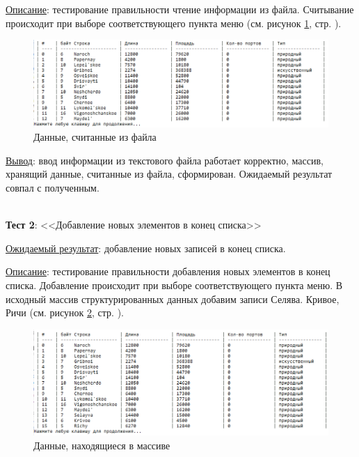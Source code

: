 \underline{Описание}: тестирование правильности чтение информации из файла. Считывание происходит при выборе соответствующего пункта меню (см. рисунок \ref{fig:data_tsv}, стр. \pageref{fig:data_tsv}).


\begin{figure}[!hp]
    \begin{center}
        \includegraphics[width=16cm]{../includes_PZ/tests/data-tsv.png}
    \end{center}
    \caption{Данные, считанные из файла\label{fig:data_tsv}}
\end{figure}

\underline{Вывод}: ввод информации из текстового файла работает корректно, массив, хранящий данные, считанные из файла, сформирован. Ожидаемый результат совпал с полученным. 

\hspace{0pt}\\



\textbf{Тест 2}: <<Добавление новых элементов в конец списка>>

\underline{Ожидаемый результат}: добавление новых записей в конец списка.

\underline{Описание}: тестирование правильности добавления новых элементов в конец списка. Добавление происходит при выборе соответствующего пункта меню. В исходный массив структурированных данных добавим записи Селява. Кривое, Ричи (см. рисунок \ref{fig:data_tsv_2}, стр. \pageref{fig:data_tsv_2}).


\begin{figure}[!hp]
    \begin{center}
        \includegraphics[width=16cm]{../includes_PZ/tests/data-tsv-2.png}
    \end{center}
    \caption{Данные, находящиеся в массиве\label{fig:data_tsv_2}}
\end{figure}

